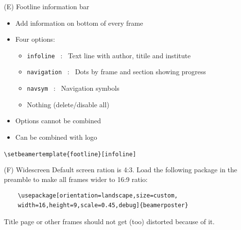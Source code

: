 \documentclass[10pt,t]{beamer}
\begin{document}
\begin{frame}[fragile]{(E) Footline information bar}
\begin{itemize}
    \item Add information on bottom of every frame
    \item Four options:
    \begin{itemize}
        \item \verb+infoline+ ~:~ Text line with author, titile and institute
        \item \verb+navigation+  ~:~ Dots by frame and section showing progress
        \item \verb+navsym+  ~:~ Navigation symbols
        \item Nothing (delete/disable all)
    \end{itemize}
    \smallskip
    \item Options cannot be combined
    \item Can be combined with logo
    
\end{itemize}

\medskip
\verb+\setbeamertemplate{footline}[+{\color{red}\verb+infoline+}\verb+]+
\end{frame}






\begin{frame}[fragile]{(F) Widescreen}
	Default screen ration is 4:3.  Load the following package in the preamble to make all frames wider to 16:9 ratio:
	
	\begin{verbatim}
	\usepackage[orientation=landscape,size=custom,
	width=16,height=9,scale=0.45,debug]{beamerposter} 
	\end{verbatim}
	
	Title page or other frames should not get (too) distorted because of it. 
\end{frame}

















\end{document}
